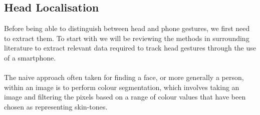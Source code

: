 

\subsection{Head Localisation}
Before being able to distinguish between head and phone gestures, we first need to extract them. 
To start with we will be reviewing the methods in surrounding literature to extract relevant data required to track head gestures through the use of a smartphone.
\\\\
The naive approach often taken for finding a face, or more generally a person, within an image is to perform colour segmentation\cite{huang2004robust,bin2007rgb,chan2004face}, which involves taking an image and filtering the pixels based on a range of colour values that have been chosen as representing skin-tones.

